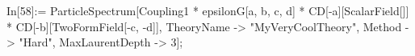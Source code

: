 In[58]:= ParticleSpectrum[Coupling1 * epsilonG[a, b, c, d] * CD[-a][ScalarField[]] * CD[-b][TwoFormField[-c, -d]], TheoryName -> "MyVeryCoolTheory", Method -> "Hard", MaxLaurentDepth -> 3]; 